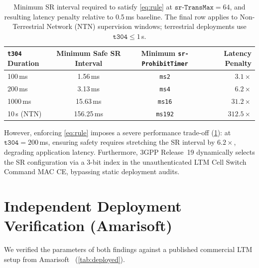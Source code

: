 \begin{table}[htbp]
  \centering
  \caption[Minimum safe SR interval satisfying Equation~(5.2)]{Minimum SR interval required to satisfy \cref{eq:rule} at $\texttt{sr-TransMax}=64$, and resulting latency penalty relative to 0.5\,ms baseline. The final row applies to Non-Terrestrial Network (NTN) supervision windows; terrestrial deployments use $\texttt{t304} \le 1$\,s.}
  \label{tab:rule}
  \small
  \begin{tabularx}{\textwidth}{@{}X c c r@{}}
    \toprule
    \texttt{t304} Duration & Minimum Safe SR Interval & Minimum \texttt{sr-ProhibitTimer} & Latency Penalty \\
    \midrule
    100\,ms   & 1.56\,ms   & \texttt{ms2}   & $3.1\times$ \\
    200\,ms   & 3.13\,ms   & \texttt{ms4}   & $6.2\times$ \\
    1000\,ms  & 15.63\,ms  & \texttt{ms16}  & $31.2\times$ \\
    10\,s (NTN) & 156.25\,ms & \texttt{ms192} & $312.5\times$ \\
    \bottomrule
  \end{tabularx}
\end{table}

However, enforcing \cref{eq:rule} imposes a severe performance trade-off (\cref{tab:rule}): at
$\texttt{t304}=200$\,ms, ensuring safety requires stretching the SR interval by $6.2\times$, degrading
application latency. Furthermore, 3GPP Release~19 dynamically selects the SR configuration via a 3-bit index in the
unauthenticated LTM Cell Switch Command MAC CE, bypassing static deployment audits.

\section{Independent Deployment Verification (Amarisoft)}
\label{sec:deployed}

We verified the parameters of both findings against a published commercial LTM setup from
Amarisoft~\cite{amarisoft2026ltm} (\cref{tab:deployed}).

